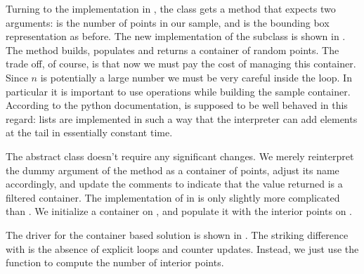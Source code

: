 Turning to the implementation in , the class
 gets a method  that expects two arguments:  is
the number of points in our sample, and  is the bounding box representation as
before.
%
%
The new implementation of the subclass  is shown in
. The method  builds, populates and returns a
container of  random points. The trade off, of course, is that now we must pay
the cost of managing this container. Since $n$ is potentially a large number we must be very
careful inside the  loop. In particular it is important to use 
operations while building the sample container. According to the python documentation,
 is supposed to be well behaved in this regard: lists are implemented in
such a way that the interpreter can add elements at the tail in essentially constant time.
%
%

The abstract class  doesn't require any significant changes. We merely reinterpret
the dummy argument  of the method  as a container of
points, adjust its name accordingly, and update the comments to indicate that the value
returned is a filtered container.
%
%
The implementation of  in  is only slightly more
complicated than . We initialize a container  on
, and populate it with the interior points on .
%
%

The driver for the container based solution is shown in .
The striking difference with  is the absence of explicit loops and
counter updates. Instead, we just use the function  to compute the number of
interior points.
%
%

